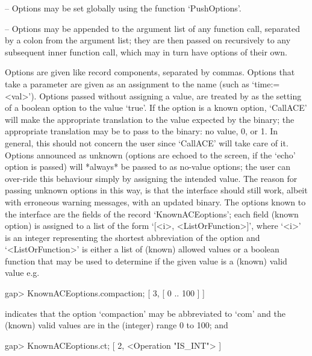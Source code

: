 \beginlist

\item{--} Options may be set globally using the function `PushOptions'.

\item{--} Options may be appended to the argument list of any function
call,  separated by a  colon from  the argument  list;  they  are then
passed on recursively to any subsequent inner function call, which may
in turn have options of their own.


\endlist

Options  are  given  like  record  components,  separated  by  commas.
Options that take a parameter are  given as an  assignment to the name
(such  as `time:=<val>').   Options passed without assigning a value,
are treated by {\GAP} as the setting of a boolean option to the value
`true'. If the option is a known {\ACE} option, `CallACE' will   make
the   appropriate  translation  to  the value expected by the  {\ACE}
binary; the appropriate translation may be to pass to the binary:  no
value, 0, or 1.  In general,  this  should not concern the user since
`CallACE' will take care of it. Options announced as unknown (options
are  echoed  to  the  screen,  if  the  `echo' option is passed) will
*always*  be  passed to  {\ACE} as no-value  options;  the  user  can
over-ride this behaviour  simply by assigning the intended value. The
reason for  passing  unknown  options in this way, is that the {\ACE} 
interface should still work,  albeit with erroneous warning messages,
with  an  updated  binary. The  {\ACE}  options  known  to the {\ACE} 
interface are the fields of the record `KnownACEoptions';  each field
(known {\ACE} option) is assigned to a list of the form
`[<i>, <ListOrFunction>]', where `<i>' is an integer representing the
shortest abbreviation of the option and `<ListOrFunction>' is  either
a list of (known) allowed values or a boolean function that  may   be 
used to determine if the given value is a (known) valid value e.g.

\begintt
gap> KnownACEoptions.compaction;
[ 3, [ 0 .. 100 ] ]
\endtt

indicates that the option `compaction' may be  abbreviated  to  `com'
and the (known) valid values are in the (integer) range 0 to 100; and

\begintt
gap> KnownACEoptions.ct;
[ 2, <Operation "IS_INT"> ]
\endtt

